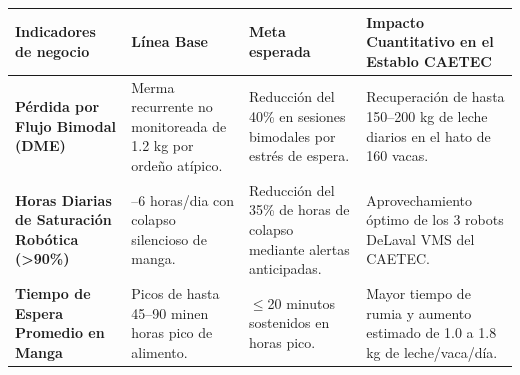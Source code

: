 \documentclass[11pt,letterpaper,DIV=12]{scrartcl}
\begin{document}
\noindent
\begin{tabularx}{\textwidth}{>{\raggedright\arraybackslash}X>{\raggedright\arraybackslash}X>{\raggedright\arraybackslash}X>{\raggedright\arraybackslash}X}
  \toprule
  Indicadores de negocio & Línea Base & Meta esperada & Impacto Cuantitativo en el Establo CAETEC \\
  \midrule
  \textbf{Pérdida por Flujo Bimodal (DME)} & Merma recurrente no monitoreada de 1.2 kg por ordeño atípico. & Reducción del 40\% en sesiones bimodales por estrés de espera. & Recuperación de hasta 150--200 kg de leche diarios en el hato de 160 vacas. \\
  \addlinespace
  \textbf{Horas Diarias de Saturación Robótica (>90\%)} & 4--6 horas/dia con colapso silencioso de manga. & Reducción del 35\% de horas de colapso mediante alertas anticipadas. & Aprovechamiento óptimo de los 3 robots DeLaval VMS del CAETEC. \\
  \addlinespace
  \textbf{Tiempo de Espera Promedio en Manga} & Picos de hasta 45--90 minen horas pico de alimento. & $\leq$20 minutos sostenidos en horas pico. & Mayor tiempo de rumia y aumento estimado de 1.0 a 1.8 kg de leche/vaca/día. \\
  \bottomrule
\end{tabularx}

\printbibliography
\end{document}
